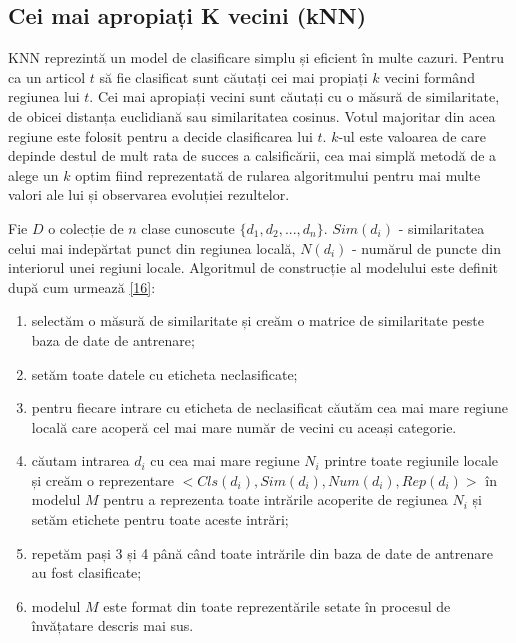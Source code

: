 \subsection{Cei mai apropiați K vecini (kNN)}
KNN reprezintă un model de clasificare simplu și eficient în multe cazuri. Pentru ca un articol $t$ să fie clasificat sunt căutați cei mai propiați $k$ vecini formând regiunea lui $t$. Cei mai apropiați vecini sunt căutați cu o măsură de similaritate, de obicei distanța euclidiană sau similaritatea cosinus. Votul majoritar din acea regiune este folosit pentru a decide clasificarea lui $t$. $k$-ul este valoarea de care depinde destul de mult rata de succes a calsificării, cea mai simplă metodă de a alege un $k$ optim fiind reprezentată de rularea algoritmului pentru mai multe valori ale lui și observarea evoluției rezultelor.

\vspace{5mm}
Fie $D$ o colecție de $n$ clase cunoscute $\{d_1, d_2,..., d_n\}$. $Sim(d_i)$ - similaritatea celui mai indepărtat punct din regiunea locală, $N(d_i)$ - numărul de puncte din interiorul unei regiuni locale. Algoritmul de construcție al modelului este definit după cum urmează \hyperlink{gongdeguo}{[16]}:
\begin{enumerate}
	\item selectăm o măsură de similaritate și creăm o matrice de similaritate peste baza de date de antrenare;
	\item setăm toate datele cu eticheta neclasificate;
	\item pentru fiecare intrare cu eticheta de neclasificat căutăm cea mai mare regiune locală care acoperă cel mai mare număr de vecini cu aceași categorie.
	\item căutam intrarea $d_i$ cu cea mai mare regiune $N_i$ printre toate regiunile locale și creăm o reprezentare $<Cls(d_i), Sim(d_i), Num(d_i), Rep(d_i)>$ în modelul $M$ pentru a reprezenta toate intrările acoperite de regiunea $N_i$ și setăm etichete pentru toate aceste intrări;
	\item repetăm pași 3 și 4 până când toate intrările din baza de date de antrenare au fost clasificate;
	\item modelul $M$ este format din toate reprezentările setate în procesul de învățatare descris mai sus.
\end{enumerate}

